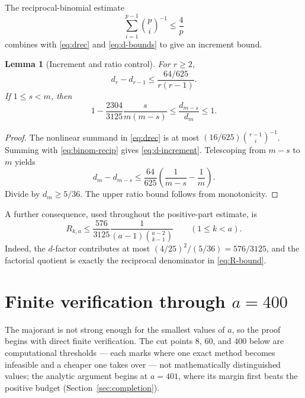 \documentclass[11pt]{article}
\newtheorem{lemma}[theorem]{Lemma}
\theoremstyle{definition}
\theoremstyle{remark}
\begin{document}
The reciprocal-binomial estimate
\begin{equation}\label{eq:binom-recip}
  \sum_{i=1}^{p-1}\binom pi^{-1}\le\frac4p
\end{equation}
combines with \eqref{eq:drec} and \eqref{eq:d-bounds} to give an increment
bound.

\begin{lemma}[Increment and ratio control]\label{lem:d-ratio}
For $r\ge2$,
\begin{equation}\label{eq:d-increment}
  d_r-d_{r-1}\le\frac{64/625}{r(r-1)}.
\end{equation}
If $1\le s<m$, then
\begin{equation}\label{eq:d-ratio}
  1-\frac{2304}{3125}\frac{s}{m(m-s)}
  \le\frac{d_{m-s}}{d_m}\le1.
\end{equation}
\end{lemma}

\begin{proof}
The nonlinear summand in \eqref{eq:drec} is at most
$(16/625)\binom{r-1}{i}^{-1}$.  Summing with
\eqref{eq:binom-recip} gives \eqref{eq:d-increment}.  Telescoping from
$m-s$ to $m$ yields
\[
 d_m-d_{m-s}\le\frac{64}{625}
      \left(\frac1{m-s}-\frac1m\right).
\]
Divide by $d_m\ge5/36$.  The upper ratio bound follows from monotonicity.
\end{proof}

A further consequence, used throughout the positive-part estimate, is
\begin{equation}\label{eq:R-bound}
 R_{k,a}\le
 \frac{576}{3125}
 \frac1{(a-1)\binom{a-2}{k-1}}
 \qquad(1\le k<a).
\end{equation}
Indeed, the $d$-factor contributes at most
$(4/25)^2/(5/36)=576/3125$, and the factorial quotient is exactly the
reciprocal denominator in \eqref{eq:R-bound}.

\section{Finite verification through \texorpdfstring{$a=400$}{a=400}}\label{sec:finite}

The majorant is not strong enough for the smallest values of $a$, so the
proof begins with direct finite verification.  The cut points $8$, $60$,
and $400$ below are computational thresholds --- each marks where one exact
method becomes infeasible and a cheaper one takes over --- not mathematically
distinguished values; the analytic argument begins at $a=401$, where its margin
first beats the positive budget (Section~\ref{sec:completion}).
\end{document}
